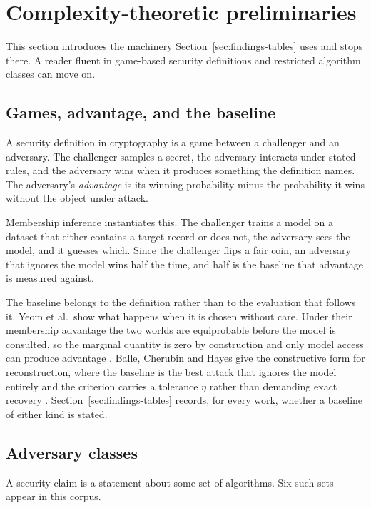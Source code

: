 \section{Complexity-theoretic preliminaries}
\label{sec:prelim}

This section introduces the machinery Section~\ref{sec:findings-tables} uses and
stops there. A reader fluent in game-based security definitions and restricted
algorithm classes can move on.

\subsection{Games, advantage, and the baseline}

A security definition in cryptography is a game between a challenger and an
adversary. The challenger samples a secret, the adversary interacts under stated
rules, and the adversary wins when it produces something the definition names. The
adversary's \emph{advantage} is its winning probability minus the probability it
wins without the object under attack.

Membership inference instantiates this. The challenger trains a model on a dataset
that either contains a target record or does not, the adversary sees the model, and
it guesses which. Since the challenger flips a fair coin, an adversary that ignores
the model wins half the time, and half is the baseline that advantage is measured
against.

The baseline belongs to the definition rather than to the evaluation that follows
it. Yeom et al.\ show what happens when it is chosen without care. Under their
membership advantage the two worlds are equiprobable before the model is consulted,
so the marginal quantity is zero by construction and only model access can produce
advantage \cite{YGFJ18}. Balle, Cherubin and Hayes give the constructive form for
reconstruction, where the baseline is the best attack that ignores the model
entirely and the criterion carries a tolerance $\eta$ rather than demanding exact
recovery \cite{BCH22}. Section~\ref{sec:findings-tables} records, for every work,
whether a baseline of either kind is stated.

\subsection{Adversary classes}

A security claim is a statement about some set of algorithms. Six such sets appear
in this corpus.

